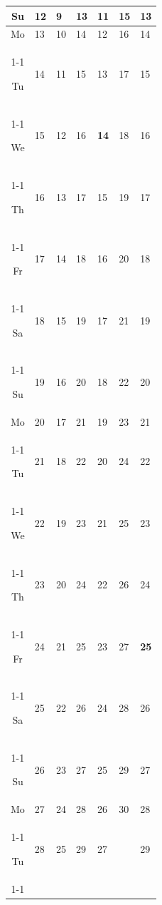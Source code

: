 \documentclass[a4paper]{article}
\newcommand{\datestrut}{\rule{0pt}{12pt}}
\begin{document}
\begin{center}
\begin{tabular}{|c||p{2.5cm}|p{2.5cm}|p{2.5cm}|p{2.5cm}|p{2.5cm}|p{2.5cm}|}
\datestrut Su & 12 & 9 & 13 & 11 & 15 & 13 \\
\hline\hline
\datestrut Mo & 13 & 10 & 14 & 12 & 16 & 14 \\
\cline{1-1}\cline{2-2}\cline{3-3}\cline{4-4}\cline{5-5}\cline{6-6}\cline{7-7}
\datestrut Tu & 14 & 11 & 15 & 13 & 17 & 15 \\
\cline{1-1}\cline{2-2}\cline{3-3}\cline{4-4}\cline{5-5}\cline{6-6}\cline{7-7}
\datestrut We & 15 & 12 & 16 & \textbf{14} & 18 & 16 \\
\cline{1-1}\cline{2-2}\cline{3-3}\cline{4-4}\cline{5-5}\cline{6-6}\cline{7-7}
\datestrut Th & 16 & 13 & 17 & 15 & 19 & 17 \\
\cline{1-1}\cline{2-2}\cline{3-3}\cline{4-4}\cline{5-5}\cline{6-6}\cline{7-7}
\datestrut Fr & 17 & 14 & 18 & 16 & 20 & 18 \\
\cline{1-1}\cline{2-2}\cline{3-3}\cline{4-4}\cline{5-5}\cline{6-6}\cline{7-7}
\datestrut Sa & 18 & 15 & 19 & 17 & 21 & 19 \\
\cline{1-1}\cline{2-2}\cline{3-3}\cline{4-4}\cline{5-5}\cline{6-6}\cline{7-7}
\datestrut Su & 19 & 16 & 20 & 18 & 22 & 20 \\
\hline\hline
\datestrut Mo & 20 & 17 & 21 & 19 & 23 & 21 \\
\cline{1-1}\cline{2-2}\cline{3-3}\cline{4-4}\cline{5-5}\cline{6-6}\cline{7-7}
\datestrut Tu & 21 & 18 & 22 & 20 & 24 & 22 \\
\cline{1-1}\cline{2-2}\cline{3-3}\cline{4-4}\cline{5-5}\cline{6-6}\cline{7-7}
\datestrut We & 22 & 19 & 23 & 21 & 25 & 23 \\
\cline{1-1}\cline{2-2}\cline{3-3}\cline{4-4}\cline{5-5}\cline{6-6}\cline{7-7}
\datestrut Th & 23 & 20 & 24 & 22 & 26 & 24 \\
\cline{1-1}\cline{2-2}\cline{3-3}\cline{4-4}\cline{5-5}\cline{6-6}\cline{7-7}
\datestrut Fr & 24 & 21 & 25 & 23 & 27 & \textbf{25} \\
\cline{1-1}\cline{2-2}\cline{3-3}\cline{4-4}\cline{5-5}\cline{6-6}\cline{7-7}
\datestrut Sa & 25 & 22 & 26 & 24 & 28 & 26 \\
\cline{1-1}\cline{2-2}\cline{3-3}\cline{4-4}\cline{5-5}\cline{6-6}\cline{7-7}
\datestrut Su & 26 & 23 & 27 & 25 & 29 & 27 \\
\hline\hline
\datestrut Mo & 27 & 24 & 28 & 26 & 30 & 28 \\
\cline{1-1}\cline{2-2}\cline{3-3}\cline{4-4}\cline{5-5}\cline{6-6}\cline{7-7}
\datestrut Tu & 28 & 25 & 29 & 27 &  & 29 \\
\cline{1-1}\cline{2-2}\cline{3-3}\cline{4-4}\cline{5-5}\cline{7-7}

\end{tabular}
\end{center}
\end{document}
